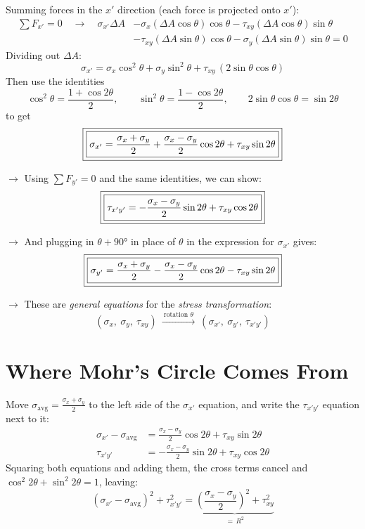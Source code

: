 \documentclass[11pt]{article}
\begin{document}
\bigskip
\noindent
Summing forces in the $x'$ direction (each force is projected onto $x'$):
\begin{align*}
  \textstyle\sum F_{x'} = 0 \quad\rightarrow\quad
  \sigma_{x'}\Delta A
  &- \sigma_x(\Delta A\cos\theta)\cos\theta
   - \tau_{xy}(\Delta A\cos\theta)\sin\theta \\
  &- \tau_{xy}(\Delta A\sin\theta)\cos\theta
   - \sigma_y(\Delta A\sin\theta)\sin\theta = 0
\end{align*}
Dividing out $\Delta A$:
\[
  \sigma_{x'} = \sigma_x\cos^2\theta + \sigma_y\sin^2\theta
               + \tau_{xy}\,(2\sin\theta\cos\theta)
\]
Then use the identities
\[
  \cos^2\theta = \frac{1 + \cos 2\theta}{2}, \qquad
  \sin^2\theta = \frac{1 - \cos 2\theta}{2}, \qquad
  2\sin\theta\cos\theta = \sin 2\theta
\]
to get
\[
  \fbox{\fbox{$\displaystyle
    \sigma_{x'} = \frac{\sigma_x + \sigma_y}{2} + \frac{\sigma_x - \sigma_y}{2}\cos 2\theta
                  + \tau_{xy}\sin 2\theta$}}
\]

\noindent
$\rightarrow$ Using $\sum F_{y'} = 0$ and the same identities, we can show:
\[
  \fbox{\fbox{$\displaystyle
    \tau_{x'y'} = -\frac{\sigma_x - \sigma_y}{2}\sin 2\theta + \tau_{xy}\cos 2\theta$}}
\]

\noindent
$\rightarrow$ And plugging in $\theta + \ang{90}$ in place of $\theta$ in the expression for
$\sigma_{x'}$ gives:
\[
  \fbox{\fbox{$\displaystyle
    \sigma_{y'} = \frac{\sigma_x + \sigma_y}{2} - \frac{\sigma_x - \sigma_y}{2}\cos 2\theta
                  - \tau_{xy}\sin 2\theta$}}
\]

\noindent
$\rightarrow$ These are \emph{general equations} for the \emph{stress transformation}:
\[
  (\sigma_x,\ \sigma_y,\ \tau_{xy})
  \ \xrightarrow{\ \text{rotation } \theta\ }\
  (\sigma_{x'},\ \sigma_{y'},\ \tau_{x'y'})
\]

\section*{Where Mohr's Circle Comes From}

\noindent
Move $\sigma_{\text{avg}} = \frac{\sigma_x + \sigma_y}{2}$ to the left side of the
$\sigma_{x'}$ equation, and write the $\tau_{x'y'}$ equation next to it:
\begin{align*}
  \sigma_{x'} - \sigma_{\text{avg}} &= \frac{\sigma_x - \sigma_y}{2}\cos 2\theta
                                       + \tau_{xy}\sin 2\theta \\
  \tau_{x'y'} &= -\frac{\sigma_x - \sigma_y}{2}\sin 2\theta + \tau_{xy}\cos 2\theta
\end{align*}
Squaring both equations and adding them, the cross terms cancel and
$\cos^2 2\theta + \sin^2 2\theta = 1$, leaving:
\[
  \left(\sigma_{x'} - \sigma_{\text{avg}}\right)^2 + \tau_{x'y'}^2
  = \underbrace{\left(\frac{\sigma_x - \sigma_y}{2}\right)^2 + \tau_{xy}^2}_{=\,R^2}
\]
\end{document}
